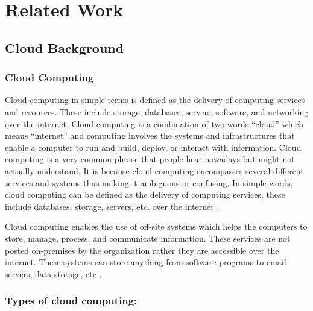 
\chapter{Related Work}

\section{Cloud Background}

\subsection{Cloud Computing}
Cloud computing in simple terms is defined as the delivery of computing services and resources. These include
storage, databases, servers, software, and networking over the internet. Cloud computing is a combination of two
words “cloud” which means “internet” and computing involves the systems and infrastructures that enable a computer to run and build, deploy, or interact with information. Cloud computing is a very common phrase that people hear nowadays but might not actually understand. It is because cloud computing encompasses several different services and systems thus making it ambiguous or confusing. In simple words, cloud computing can be defined as the delivery of computing services, these include databases, storage, servers, etc. over the internet \cite{11}.

Cloud computing enables the use of off-site systems which helps the computers to store, manage, process, and
communicate information.
These services are not posted on-premises by the
organization rather they are accessible over the internet.
These systems can store anything from software programs to email servers, data storage, etc \cite{11}
\cite{12}.

\subsection{Types of cloud computing:}


